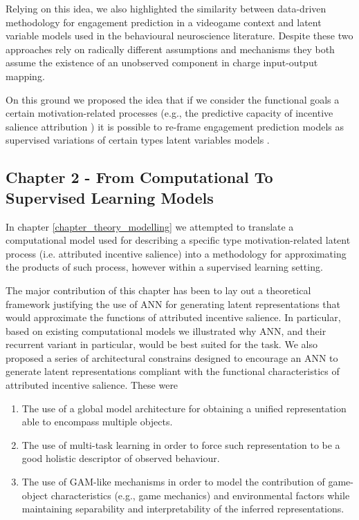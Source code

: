 Relying on this idea, we also highlighted the similarity between data-driven methodology for engagement prediction in a videogame context and latent variable models used in the behavioural neuroscience literature. Despite these two approaches rely on radically different assumptions and mechanisms \cite{murphy2022probabilistic} they both assume the existence of an unobserved component in charge input-output mapping.

On this ground we proposed the idea that if we consider the functional goals a certain motivation-related processes (e.g., the predictive capacity of incentive salience attribution \cite{berridge2004motivation}) it is possible to re-frame engagement prediction models as supervised variations of certain types latent variables models \cite{luxem2020identifying, mccullough2021unsupervised}.

\subsection{Chapter 2 - From Computational To Supervised Learning Models}
\label{discussion_chapter_two}
In chapter \ref{chapter_theory_modelling} we attempted to translate a computational model used for describing a specific type motivation-related latent process (i.e. attributed incentive salience) into a methodology for approximating the products of such process, however within a supervised learning setting.

The major contribution of this chapter has been to lay out a theoretical framework justifying the use of ANN for generating latent representations that would approximate the functions of attributed incentive salience. In particular, based on existing computational models \cite{mcclure2003computational, zhang2009neural} we illustrated why ANN, and their recurrent variant in particular, would be best suited for the task. We also proposed a series of architectural constrains designed  to encourage an ANN to generate latent representations compliant with the functional characteristics of attributed incentive salience. These were

\begin{enumerate}
    \item The use of a global model architecture for obtaining a unified representation able to encompass multiple objects.
    \item The use of multi-task learning in order to force such representation to be a good holistic descriptor of observed behaviour.
    \item The use of GAM-like mechanisms in order to model the contribution of game-object characteristics (e.g., game mechanics) and environmental factors while maintaining separability and interpretability of the inferred representations.
\end{enumerate}


